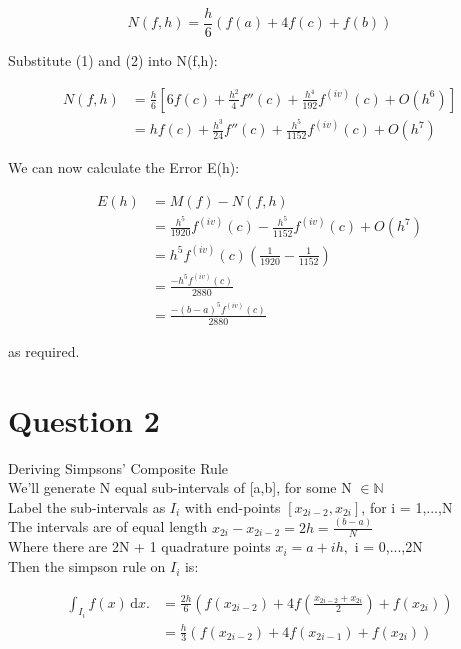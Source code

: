 \documentclass[fleqn]{report}
\begin{document}
\begin{equation*}
N(f,h) = \frac{h}{6}(f(a) + 4f(c) + f(b))
\end{equation*}

Substitute (1) and (2) into N(f,h):

\begin{equation*}
\begin{split}
N(f,h) & =\frac{h}{6}[6f(c) + \frac{h^2}{4}f''(c) + \frac{h^4}{192}f^{(iv)}(c) + O(h^6)]\\
& = hf(c) + \frac{h^3}{24}f''(c) + \frac{h^5}{1152}f^{(iv)}(c) + O(h^7)
\end{split}
\end{equation*}

We can now calculate the Error E(h):

\begin{equation*}
\begin{split}
E(h) & =M(f) - N(f,h)\\
& = \frac{h^5}{1920}f^{(iv)}(c) -  \frac{h^5}{1152}f^{(iv)}(c) + O(h^7) \\
& = h^5f^{(iv)}(c)(\frac{1}{1920} - \frac{1}{1152})\\
& = \frac{-h^5f^{(iv)}(c)}{2880}\\
& = \frac{-(b-a)^5f^{(iv)}(c)}{2880}
\end{split}
\end{equation*}

as required.

\pagebreak



\section{Question 2}
Deriving Simpsons' Composite Rule\\

We'll generate N equal sub-intervals of [a,b], for some N $\in \mathbb{N}$\\
Label the sub-intervals as $I_{i}$ with end-points $[x_{2i-2}, x_{2i}]$, for i = 1,...,N\\
The intervals are of equal length $x_{2i} - x_{2i-2} = 2h = \frac{(b - a)}{N}$\\
Where there are 2N + 1 quadrature points $x_{i} = a + ih,$ i = 0,...,2N\\

Then the simpson rule on $I_{i}$ is:

\begin{equation*}
\begin{split}
\int_{I_i} \! f(x) \, \mathrm{d}x. & = \frac{2h}{6}
(f(x_{2i-2}) + 4f(\frac{x_{2i-2} + x_{2i}}{2}) + f(x_{2i}))\\
& = \frac{h}{3}(f(x_{2i-2}) + 4f(x_{2i-1}) + f(x_{2i}))
\end{split}
\end{equation*}
\end{document}
